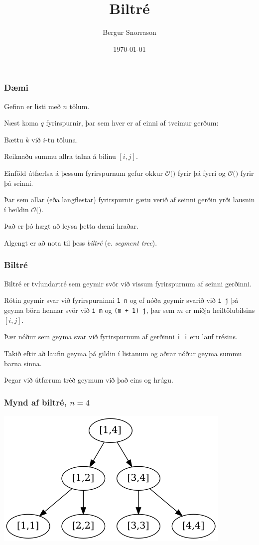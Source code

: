 \title{Biltré}
\author{Bergur Snorrason}
\date{\today}



\frame{\titlepage}

{
	\frametitle{Dæmi}
	{
		\item<1-> Gefinn er listi með $n$ tölum.
		\item<2-> Næst koma $q$ fyrirspurnir, þar sem hver er af einni af tveimur gerðum:
		{
			\item<3-> Bættu $k$ við $i$-tu töluna.
			\item<4-> Reiknaðu summu allra talna á bilinu $[i, j]$.
		}
		\item<5-> Einföld útfærlsa á þessum fyrirspurnum gefur okkur
					$\mathcal{O}($$)$ fyrir þá fyrri og
					$\mathcal{O}($$)$ fyrir þá seinni.
		\item<8-> Þar sem allar (eða langflestar) fyrirspurnir gætu verið af seinni gerðin yrði lausnin í heildin 
					$\mathcal{O}($\onslide<9->{$qn$}$)$.
		\item<10-> Það er þó hægt að leysa þetta dæmi hraðar.
		\item<11-> Algengt er að nota til þess \emph{biltré} (e. \emph{segment tree}).
	}
}

{
	\frametitle{Biltré}
	{
		\item<1-> Biltré er tvíundartré sem geymir svör við vissum fyrirspurnum af seinni gerðinni.
		\item<2-> Rótin geymir svar við fyrirspurninni \texttt{1 n} 
					og ef nóða geymir svarið við \texttt{i j} þá geyma börn hennar svör við \texttt{i m}
					og \texttt{(m + 1) j}, þar sem $m$ er miðja heiltölubilsins $[i, j]$.
		\item<3-> Þær nóður sem geyma svar við fyrirspurnum af gerðinni \texttt{i i} eru lauf trésins.
		\item<4-> Takið eftir að laufin geyma þá gildin í listanum og aðrar nóður geyma summu barna sinna.
		\item<5-> Þegar við útfærum tréð geymum við það eins og hrúgu.
	}
}

{
	\frametitle{Mynd af biltré, $n = 4$}
	{
		\includegraphics[scale=0.5]{fig/mynd2.png}
	}
}

